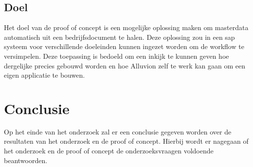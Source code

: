 \subsection{Doel}
Het doel van de proof of concept is een mogelijke oplossing maken om masterdata automatisch uit een bedrijfsdocument te halen. Deze oplossing zou in een sap systeem voor verschillende doeleinden kunnen ingezet worden om de workflow te versimpelen. Deze toepassing is bedoeld om een inkijk te kunnen geven hoe dergelijke precies gebouwd worden en hoe Alluvion zelf te werk kan gaan om een eigen applicatie te bouwen.


\section{Conclusie}
Op het einde van het onderzoek zal er een conclusie gegeven worden over de resultaten van het onderzoek en de proof of concept. Hierbij wordt er nagegaan of het onderzoek en de proof of concept de onderzoeksvraagen voldoende beantwoorden.